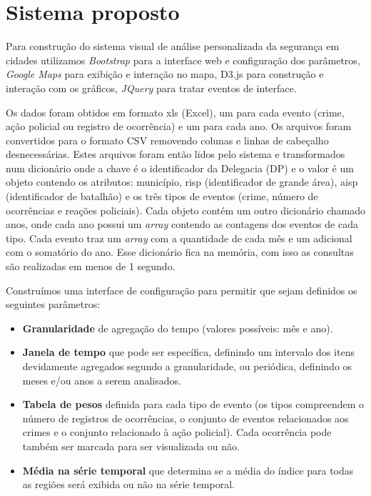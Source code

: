 \documentclass[10pt,conference]{IEEEtran}
\begin{document}
\section{Sistema proposto}

Para construção do sistema visual de análise personalizada da segurança em cidades utilizamos \textit{Bootstrap} \cite{Bootstrap2017} para a interface web e configuração dos parâmetros, \textit{Google Maps} \cite{Google2017} para exibição e interação no mapa, D3.js \cite{MikeBostock2017} para construção e interação com os gráficos, \textit{JQuery} \cite{JQuery2017} para tratar eventos de interface. 

Os dados foram obtidos em formato xls (Excel), um para cada evento (crime, ação policial ou registro de ocorrência) e um para cada ano. Os arquivos foram convertidos para o formato CSV removendo colunas e linhas de cabeçalho desnecessárias. Estes arquivos foram então lidos pelo sistema e transformados num dicionário onde a chave é o identificador da Delegacia (DP) e o valor é um objeto contendo os atributos: município, risp (identificador de grande área), aisp (identificador de batalhão) e os três tipos de eventos (crime, número de ocorrências e reações policiais). Cada objeto contém um outro dicionário chamado anos, onde cada ano possui um \textit{array} contendo as contagens dos eventos de cada tipo. Cada evento traz um \textit{array} com a quantidade de cada mês e um adicional com o somatório do ano. Esse dicionário fica na memória, com isso as consultas são realizadas em menos de 1 segundo.

Construímos uma interface de configuração para permitir que sejam definidos os seguintes parâmetros:

\begin{itemize}
\item \textbf{Granularidade} de agregação do tempo (valores possíveis: mês e ano).
\item \textbf{Janela de tempo} que pode ser específica, definindo um intervalo dos itens devidamente agregados segundo a granularidade, ou periódica, definindo os meses e/ou anos a serem analisados. 
\item \textbf{Tabela de pesos} definida para cada tipo de evento (os tipos compreendem o número de registros de ocorrências, o conjunto de eventos relacionados aos crimes e o conjunto relacionado à ação policial). Cada ocorrência pode também ser marcada para ser visualizada ou não.

\item \textbf{Média na série temporal} que determina se a média do índice para todas as regiões será exibida ou não na série temporal.
\end{itemize}
\end{document}
